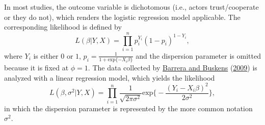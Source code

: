 \documentclass[
  11pt,
]{article}
\begin{document}
In most studies, the outcome variable is dichotomous (i.e., actors trust/cooperate or they do not), which renders the logistic regression model applicable.
The corresponding likelihood is defined by
\[
L(\beta | Y, X) = \prod^n_{i=1} p_i^{Y_i} (1 - p_i)^{1 - Y_i},
\]
where \(Y_i\) is either \(0\) or \(1\), \(p_i = \frac{1}{1 + \text{exp}\{-X_i\beta\}}\) and the dispersion parameter is omitted because it is fixed at \(\phi = 1\).
The data collected by \protect\hyperlink{ref-barrera_buskens_third_2009}{Barrera and Buskens} (\protect\hyperlink{ref-barrera_buskens_third_2009}{2009}) is analyzed with a linear regression model, which yields the likelihood
\[
L(\beta, \sigma^2 | Y, X) = \prod^n_{i=1} \frac{1}{\sqrt{2\pi\sigma^2}} \text{exp}\Bigg\{-\frac{(Y_i - X_i\beta)^2}{2\sigma^2}\Bigg\},
\]
in which the dispersion parameter is represented by the more common notation \(\sigma^2\).
\end{document}

